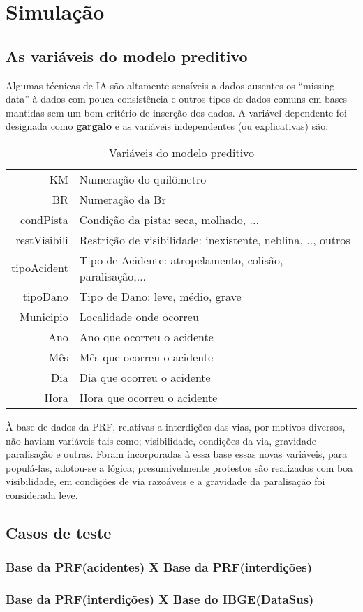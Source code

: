 \chapter{Simulação}\label{simula}

\section{ As variáveis do modelo preditivo}

Algumas técnicas de IA são altamente sensíveis a dados ausentes os ``missing data'' à dados com pouca consistência e outros tipos de dados 
comuns em bases mantidas sem um bom critério de inserção dos dados. 
A variável dependente foi designada como \textbf{gargalo} e as variáveis independentes (ou explicativas) são:


\begin{table}[htbp]
 \centering
  \caption{Variáveis do modelo preditivo}
  
  \begin{tabular}{r|l} \hline
   KM & Numeração do quilômetro \\
   BR & Numeração da Br\\
   condPista & Condição da pista: seca, molhado, ... \\
   restVisibili & Restrição de visibilidade: inexistente, neblina, .., outros \\
   tipoAcident & Tipo de Acidente: atropelamento, colisão, paralisação,...\\
   tipoDano  & Tipo de Dano: leve, médio, grave \\
   Municipio  & Localidade onde ocorreu \\
   Ano & Ano que ocorreu o acidente \\
   Mês & Mês que ocorreu o acidente \\
   Dia & Dia que ocorreu o acidente \\
   Hora & Hora que ocorreu o acidente \\
  \end{tabular}
\end{table}

 
À base de dados da PRF, relativas a interdições das vias, por motivos diversos, não haviam variáveis tais como; visibilidade, condições da via, gravidade paralisação e outras.
Foram incorporadas à essa base essas novas variáveis, para populá-las, adotou-se a lógica; presumivelmente protestos são realizados com boa visibilidade, em condições de via razoáveis e a gravidade da paralisação foi considerada leve.

\section{Casos de teste}

\subsection{Base da PRF(acidentes) X Base da PRF(interdições)}

\subsection{Base da PRF(interdições) X Base do IBGE(DataSus)}